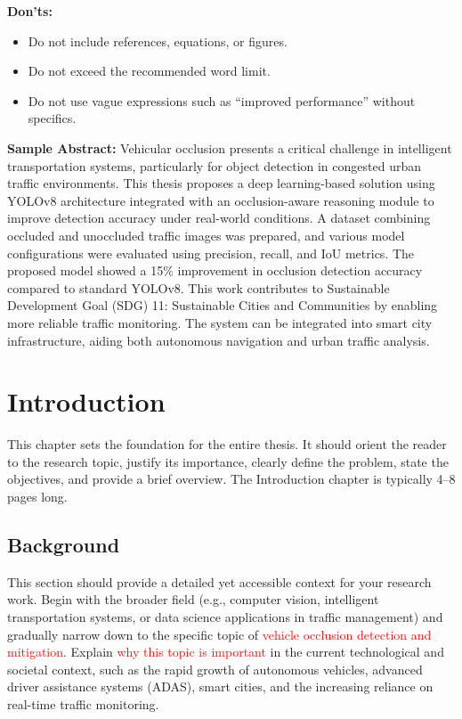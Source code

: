 \documentclass[12pt,a4paper]{report}
\theoremstyle{definition}
\theoremstyle{remark}
\begin{document}
\noindent \textbf{Don'ts:}
\begin{itemize}
    \item Do not include references, equations, or figures.
    \item Do not exceed the recommended word limit.
    \item Do not use vague expressions such as “improved performance” without specifics.
\end{itemize}

\vspace{1em}

\noindent \textbf{Sample Abstract:}
\noindent Vehicular occlusion presents a critical challenge in intelligent transportation systems, particularly for object detection in congested urban traffic environments. This thesis proposes a deep learning-based solution using YOLOv8 architecture integrated with an occlusion-aware reasoning module to improve detection accuracy under real-world conditions. A dataset combining occluded and unoccluded traffic images was prepared, and various model configurations were evaluated using precision, recall, and IoU metrics. The proposed model showed a 15\% improvement in occlusion detection accuracy compared to standard YOLOv8. This work contributes to Sustainable Development Goal (SDG) 11: Sustainable Cities and Communities by enabling more reliable traffic monitoring. The system can be integrated into smart city infrastructure, aiding both autonomous navigation and urban traffic analysis.


\newpage

\pagestyle{chapterstyle} %

\chapter{Introduction}

This chapter sets the foundation for the entire thesis. It should orient the reader to the research topic, justify its importance, clearly define the problem, state the objectives, and provide a brief overview. The Introduction chapter is typically 4--8 pages long.

\section{Background}
\label{sec:background}

This section should provide a detailed yet accessible context for your research work. Begin with the broader field (e.g., computer vision, intelligent transportation systems, or data science applications in traffic management) and gradually narrow down to the specific topic of \textcolor{red}{vehicle occlusion detection and mitigation}. Explain \textcolor{red}{why this topic is important} in the current technological and societal context, such as the rapid growth of autonomous vehicles, advanced driver assistance systems (ADAS), smart cities, and the increasing reliance on real-time traffic monitoring.
\end{document}
